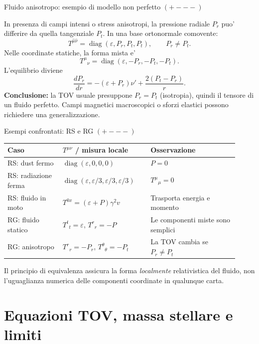 \begin{frame}[t]{Fluido anisotropo: esempio di modello non perfetto $(+---)$}\small\raggedright

In presenza di campi intensi o stress anisotropi, la pressione radiale $P_r$ puo' differire da quella tangenziale $P_t$. In una base ortonormale comovente:
\[
T^{\hat\mu\hat\nu}=\operatorname{diag}(\varepsilon,P_r,P_t,P_t),
\qquad P_r\ne P_t.
\]
Nelle coordinate statiche, la forma mista e'
\[
T^\mu{}_{\nu}=\operatorname{diag}(\varepsilon,-P_r,-P_t,-P_t).
\]
L'equilibrio diviene
\[
\frac{dP_r}{dr}=-(\varepsilon+P_r)\nu'
+\frac{2(P_t-P_r)}{r}.
\]
\textbf{Conclusione:} la TOV usuale presuppone $P_r=P_t$ (isotropia), quindi il tensore di un fluido perfetto. Campi magnetici macroscopici o sforzi elastici possono richiedere una generalizzazione.

\end{frame}

\begin{frame}[t]{Esempi confrontati: RS e RG $(+---)$}\small\raggedright

\begin{tabular}{@{}p{0.22\linewidth}p{0.35\linewidth}p{0.35\linewidth}@{}}
\toprule
Caso & $T^{\mu\nu}$ / misura locale & Osservazione \\
\midrule
RS: dust fermo & $\operatorname{diag}(\varepsilon,0,0,0)$ & $P=0$ \\
RS: radiazione ferma & $\operatorname{diag}(\varepsilon,\varepsilon/3,\varepsilon/3,\varepsilon/3)$ & $T^\mu{}_{\mu}=0$ \\
RS: fluido in moto & $T^{0x}=(\varepsilon+P)\gamma^2v$ & Trasporta energia e momento \\
RG: fluido statico & $T^t{}_t=\varepsilon$, $T^r{}_r=-P$ & Le componenti miste sono semplici \\
RG: anisotropo & $T^r{}_r=-P_r$, $T^\theta{}_\theta=-P_t$ & La TOV cambia se $P_r\ne P_t$ \\
\bottomrule
\end{tabular}
\medskip
Il principio di equivalenza assicura la forma \emph{localmente} relativistica del fluido, non l'uguaglianza numerica delle componenti coordinate in qualunque carta.

\end{frame}

\section{Equazioni TOV, massa stellare e limiti}

